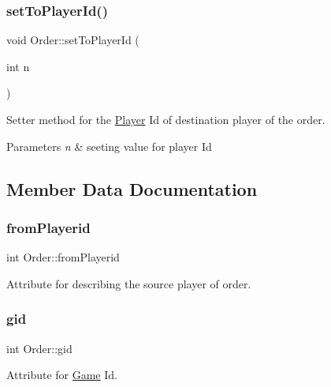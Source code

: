 \subsubsection{\texorpdfstring{set\+To\+Player\+Id()}{setToPlayerId()}}
{\footnotesize\ttfamily void Order\+::set\+To\+Player\+Id (\begin{DoxyParamCaption}\item[{int}]{n }\end{DoxyParamCaption})}



Setter method for the \hyperlink{class_player}{Player} Id of destination player of the order. 


\begin{DoxyParams}{Parameters}
{\em n} & seeting value for player Id \\
\hline
\end{DoxyParams}


\subsection{Member Data Documentation}
\mbox{\label{class_order_a6920700bdb4e87fb584c1d95c644b9c2}} 
\subsubsection{\texorpdfstring{from\+Playerid}{fromPlayerid}}
{\footnotesize\ttfamily int Order\+::from\+Playerid\hspace{0.3cm}{\ttfamily [private]}}



Attribute for describing the source player of order. 

\mbox{\label{class_order_a56356acb519b814ab01cfac7864935ff}} 
\subsubsection{\texorpdfstring{gid}{gid}}
{\footnotesize\ttfamily int Order\+::gid\hspace{0.3cm}{\ttfamily [private]}}



Attribute for \hyperlink{class_game}{Game} Id. 

\mbox{\label{class_order_ade9d8347595dcdb4494a5a8d7ebc7cbc}} 
